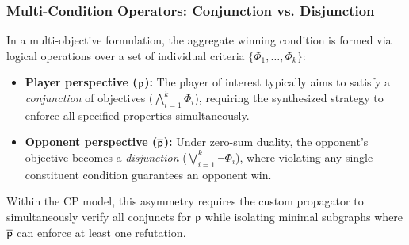 \documentclass{article}
\begin{document}
\subsubsection{Multi-Condition Operators: Conjunction vs. Disjunction}
In a multi-objective formulation, the aggregate winning condition is formed via logical operations over a set of individual criteria $\{\Phi_1, \dots, \Phi_k\}$:
\begin{itemize}
    \item \textbf{Player perspective ($\mathsf{p}$):} The player of interest typically aims to satisfy a \textit{conjunction} of objectives ($\bigwedge_{i=1}^k \Phi_i$), requiring the synthesized strategy to enforce all specified properties simultaneously.
    \item \textbf{Opponent perspective ($\overline{\mathsf{p}}$):} Under zero-sum duality, the opponent's objective becomes a \textit{disjunction} ($\bigvee_{i=1}^k \neg\Phi_i$), where violating any single constituent condition guarantees an opponent win.
\end{itemize}
Within the CP model, this asymmetry requires the custom propagator to simultaneously verify all conjuncts for $\mathsf{p}$ while isolating minimal subgraphs where $\overline{\mathsf{p}}$ can enforce at least one refutation.
\end{document}
